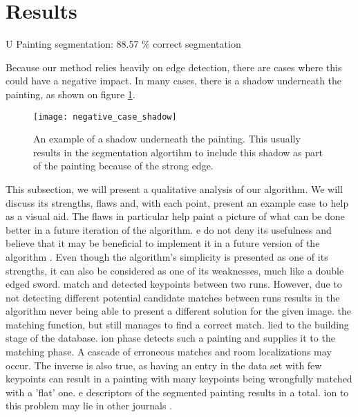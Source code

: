 \section{Results}
U
	Painting segmentation: 88.57 \% correct segmentation
	
	
	
	Because our method relies heavily on edge detection, there are cases where this could have a negative impact. In many cases, there is a shadow underneath the painting, as shown on figure \ref{fig:negative_case_shadow}.
	
	\begin{figure}
		\texttt{[image: negative\_case\_shadow]}
		\caption{An example of a shadow underneath the painting. This usually results in the segmentation algortihm to include this shadow as part of the painting because of the strong edge.}
		\label{fig:negative_case_shadow}
	\end{figure}

This subsection, we will present a qualitative analysis of our algorithm. We will discuss its strengths, flaws and, with each point, present an example case to help as a visual aid. The flaws in particular help paint a picture of what can be done better in a future iteration of the algorithm. 
e do not deny its usefulness and believe that it may be beneficial to implement it in a future version of the algorithm . Even though the algorithm's simplicity is presented as one of its strengths, it can also be considered as one of its weaknesses, much like a double edged sword.
match and detected keypoints between two runs. However, due to not detecting different potential candidate matches between runs results in the algorithm never being able to present a different solution for the given image.
 the matching function, but still manages to find a correct match.
lied to the building stage of the database.
ion phase detects such a painting and supplies it to the matching phase. A cascade of erroneous matches and room localizations may occur. The inverse is also true, as having an entry in the data set with few keypoints can result in a painting with many keypoints being wrongfully matched with a 'flat' one.
e descriptors of the segmented painting results in a total.
ion to this problem may lie in other journals . 